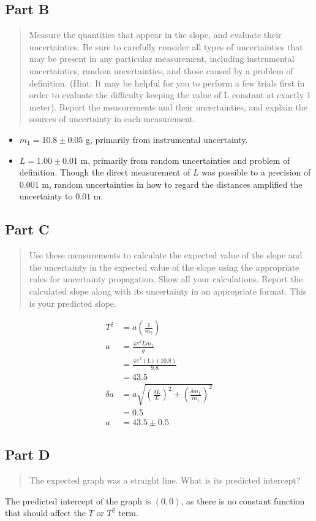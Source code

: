 \documentclass[8pt]{extarticle}
\begin{document}
{\subsection*{Part B}
\begin{quote}
	Measure the quantities that appear in the slope, and evaluate their uncertainties. Be sure to carefully consider all types of uncertainties that may be present in any particular measurement, including instrumental uncertainties, random uncertainties, and those caused by a problem of definition.  (Hint: It may be helpful for you to perform a few trials first in order to evaluate the difficulty keeping the value of L constant at exactly 1 meter). Report the measurements and their uncertainties, and explain the sources of uncertainty in each measurement.
\end{quote}
\begin{itemize}
	\item $m_1 = 10.8 \pm 0.05$ g, primarily from instrumental uncertainty.
	\item $L = 1.00 \pm 0.01$ m, primarily from random uncertainties and problem of definition. Though the direct measurement of $L$ was possible to a precision of $0.001$ m, random uncertainties in how to regard the distances amplified the uncertainty to $0.01$ m.
\end{itemize}
\subsection*{Part C}
\begin{quote}
	Use these measurements to calculate the expected value of the slope and the uncertainty in the expected value of the slope using the appropriate rules for uncertainty propagation. Show all your calculations. Report the calculated slope along with its uncertainty in an appropriate format. This is your predicted slope.
\end{quote}
\begin{align*}
	T^2 &= a\left(\frac{1}{m_2}\right) \\
	a &= \frac{4\pi^2Lm_1}{g} \\
	&= \frac{4\pi^2(1)(10.8)}{9.8} \\
	&= 43.5 \\
	\delta a &= a \sqrt{\left(\frac{\delta L}{L}\right)^2 + \left(\frac{\delta m_1}{m_1}\right)^2} \\
	&= 0.5 \\
	a &= 43.5 \pm 0.5
\end{align*}
\subsection*{Part D}
\begin{quote}
	The expected graph was a straight line.  What is its predicted intercept?
\end{quote}
The predicted intercept of the graph is $(0,0)$, as there is no constant function that should affect the $T$ or $T^2$ term.
}
\end{document}
